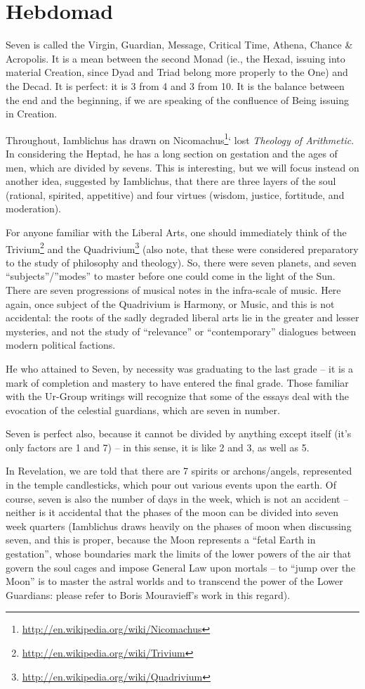 \section{Hebdomad}

Seven is called the Virgin, Guardian, Message, Critical Time, Athena, Chance \& Acropolis. It is a mean between the second Monad (ie., the Hexad, issuing into material Creation, since Dyad and Triad belong more properly to the One) and the Decad. It is perfect: it is 3 from 4 and 3 from 10. It is the balance between the end and the beginning, if we are speaking of the confluence of Being issuing in Creation.

Throughout, Iamblichus has drawn on Nicomachus\footnote{\url{http://en.wikipedia.org/wiki/Nicomachus}}` lost \emph{Theology of Arithmetic}. In considering the Heptad, he has a long section on gestation and the ages of men, which are divided by sevens. This is interesting, but we will focus instead on another idea, suggested by Iamblichus, that there are three layers of the soul (rational, spirited, appetitive) and four virtues (wisdom, justice, fortitude, and moderation).

For anyone familiar with the Liberal Arts, one should immediately think of the Trivium\footnote{\url{http://en.wikipedia.org/wiki/Trivium}} and the Quadrivium\footnote{\url{http://en.wikipedia.org/wiki/Quadrivium}} (also note, that these were considered preparatory to the study of philosophy and theology). So, there were seven planets, and seven ``subjects''/''modes'' to master before one could come in the light of the Sun. There are seven progressions of musical notes in the infra-scale of music. Here again, once subject of the Quadrivium is Harmony, or Music, and this is not accidental: the roots of the sadly degraded liberal arts lie in the greater and lesser mysteries, and not the study of ``relevance'' or ``contemporary'' dialogues between modern political factions.

He who attained to Seven, by necessity was graduating to the last grade -- it is a mark of completion and mastery to have entered the final grade. Those familiar with the Ur-Group writings will recognize that some of the essays deal with the evocation of the celestial guardians, which are seven in number.

Seven is perfect also, because it cannot be divided by anything except itself (it's only factors are 1 and 7) -- in this sense, it is like 2 and 3, as well as 5.

In Revelation, we are told that there are 7 spirits or archons/angels, represented in the temple candlesticks, which pour out various events upon the earth. Of course, seven is also the number of days in the week, which is not an accident -- neither is it accidental that the phases of the moon can be divided into seven week quarters (Iamblichus draws heavily on the phases of moon when discussing seven, and this is proper, because the Moon represents a ``fetal Earth in gestation'', whose boundaries mark the limits of the lower powers of the air that govern the soul cages and impose General Law upon mortals -- to ``jump over the Moon'' is to master the astral worlds and to transcend the power of the Lower Guardians: please refer to Boris Mouravieff's work in this regard).

